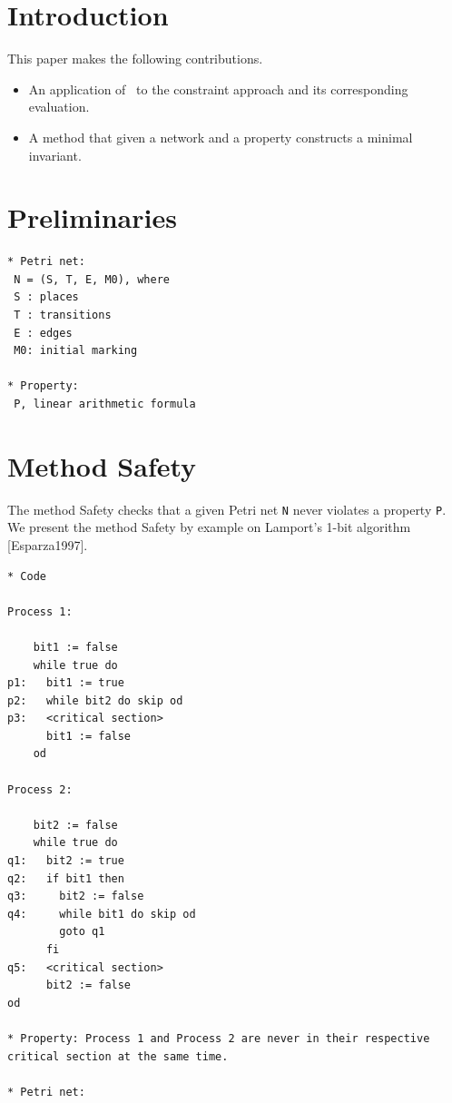 \documentclass{llncs}
\begin{document}
\section{Introduction}

This paper makes the following contributions.
\begin{itemize}
\item An application of \zthree\ to the constraint approach and its
  corresponding evaluation.
\item A method that given a network and a property constructs a
  minimal invariant.
\end{itemize}


\section{Preliminaries}


\begin{verbatim}
* Petri net:
 N = (S, T, E, M0), where
 S : places
 T : transitions
 E : edges
 M0: initial marking

* Property:
 P, linear arithmetic formula
\end{verbatim}

\newpage
\section{Method Safety}

The method Safety checks that a given Petri net \verb=N= never violates a property \verb=P=.
We present the method Safety by example on Lamport's 1-bit algorithm [Esparza1997].

\begin{verbatim}
* Code

Process 1:

    bit1 := false
    while true do
p1:   bit1 := true
p2:   while bit2 do skip od
p3:   <critical section>
      bit1 := false
    od

Process 2:

    bit2 := false
    while true do
q1:   bit2 := true
q2:   if bit1 then
q3:     bit2 := false
q4:     while bit1 do skip od
        goto q1
      fi
q5:   <critical section>
      bit2 := false
od

* Property: Process 1 and Process 2 are never in their respective critical section at the same time.

* Petri net:

\end{verbatim}
\end{document}

